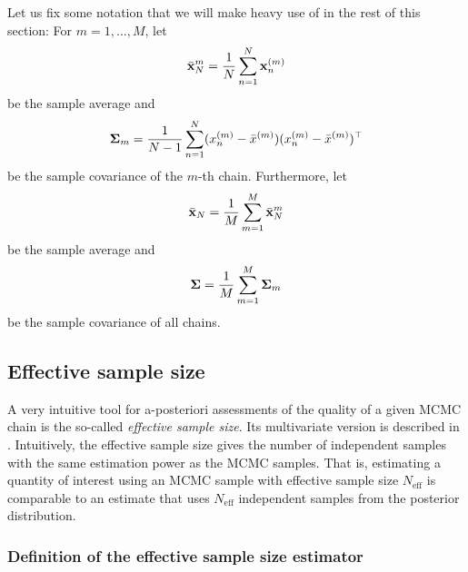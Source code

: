 \documentclass[10pt]{article}
\numberwithin{equation}{section}
\begin{document}
Let us fix some notation that we will make heavy use of in the rest of this section: For $m=1,\ldots, M$, let
\begin{align*}
\bar{\mathbf{x}}_N^{m} = \frac{1}{N} \sum_{n=1}^N \mathbf{x}_n^{(m)}
\end{align*}
be the sample average and
\begin{align*}
\mathbf{\Sigma}_m = \frac{1}{N-1} \sum_{n=1}^N (x_n^{(m)} - \bar x^{(m)}) (x_n^{(m)} - \bar x^{(m)})^\top
\end{align*}
be the sample covariance of the $m$-th chain. Furthermore, let
\begin{align*}
\bar{\mathbf{x}}_N = \frac{1}{M} \sum_{m=1}^M \bar{\mathbf{x}}_N^{m}
\end{align*}
be the sample average and
\begin{align*}
\mathbf{\Sigma} = \frac{1}{M} \sum_{m=1}^M \mathbf{\Sigma}_m
\end{align*}
be the sample covariance of all chains.




\subsection{Effective sample size}

A very intuitive tool for a-posteriori assessments of the quality of a given MCMC chain is the so-called \emph{effective sample size}. Its multivariate version is described in \cite{VatFleJon19}. Intuitively, the effective sample size gives the number of independent samples with the same estimation power as the MCMC samples. That is, estimating a quantity of interest using an MCMC sample with effective sample size $N_\text{eff}$ is comparable to an estimate that uses $N_\text{eff}$ independent samples from the posterior distribution.

\subsubsection*{Definition of the effective sample size estimator}
\end{document}
